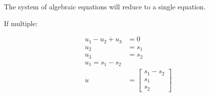 \documentclass[twocolumn,draft]{article}
\begin{document}
\begin{enumerate}
		The system of algebraic equations will reduce to a single equation.
		
		If multiple:
		
		\begin{align*}
			u_{1} -u_{2} + u_{3} &= 0 \\
			u_{2} &= s_{1} \\
			u_{3} &= s_{2} \\
			u_{1} = s_{1}-s_{2} \\
			u &= \begin{bmatrix}
					s_{1}-s_{2} \\
					s_{1} \\ 
					s_{2}
				\end{bmatrix} \\
		\end{align*}
  \end{enumerate}
  
 
\end{document}
